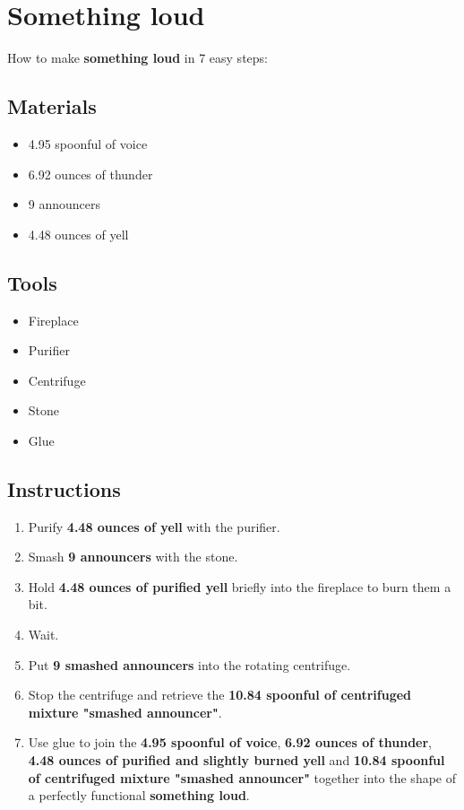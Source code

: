 \documentclass{article}
\begin{document}
\section{Something loud}How to make \textbf{something loud} in 7 easy steps:

\subsection{Materials}\begin{itemize}
\item 
4.95 spoonful of voice
\item 
6.92 ounces of thunder
\item 
9 announcers
\item 
4.48 ounces of yell
\end{itemize}
\subsection{Tools}\begin{itemize}
\item 
Fireplace
\item 
Purifier
\item 
Centrifuge
\item 
Stone
\item 
Glue
\end{itemize}
\subsection{Instructions}\begin{enumerate}
\item 
Purify \textbf{4.48 ounces of yell} with the purifier.
\item 
Smash \textbf{9 announcers} with the stone.
\item 
Hold \textbf{4.48 ounces of purified yell} briefly into the fireplace to burn them a bit.
\item 
Wait.
\item 
Put \textbf{9 smashed announcers} into the rotating centrifuge.
\item 
Stop the centrifuge and retrieve the \textbf{10.84 spoonful of centrifuged mixture "smashed announcer"}.
\item 
Use glue to join the \textbf{4.95 spoonful of voice}, \textbf{6.92 ounces of thunder}, \textbf{4.48 ounces of purified and slightly burned yell} and \textbf{10.84 spoonful of centrifuged mixture "smashed announcer"} together into the shape of a perfectly functional \textbf{something loud}.
\end{enumerate}
\newpage
\end{document}
